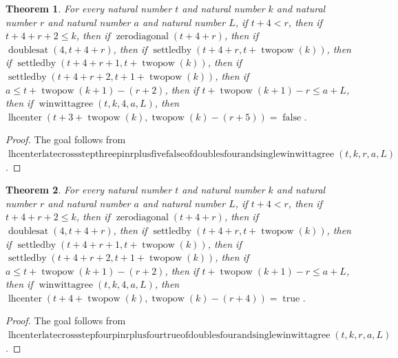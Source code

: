 \documentclass[11pt]{article}
\newtheorem{theorem}{Theorem}[section]
\theoremstyle{definition}
\begin{document}
\begin{theorem}
\label{ll:paper:lhcenter-late-cross-step-three-pin-r-plus-five-false-of-doubles-four-and-single-winwittagree}
For every natural number \(t\) and natural number \(k\) and natural number \(r\) and natural number \(a\) and natural number \(L\), if \(t + 4 < r\), then if \(t + 4 + r + 2 \le k\), then if \(\operatorname{zerodiagonal}(t + 4 + r)\), then if \(\operatorname{doublesat}(4, t + 4 + r)\), then if \(\operatorname{settledby}(t + 4 + r, t + \operatorname{twopow}(k))\), then if \(\operatorname{settledby}(t + 4 + r + 1, t + \operatorname{twopow}(k))\), then if \(\operatorname{settledby}(t + 4 + r + 2, t + 1 + \operatorname{twopow}(k))\), then if \(a \le t + \operatorname{twopow}(k + 1) - (r + 2)\), then if \(t + \operatorname{twopow}(k + 1) - r \le a + L\), then if \(\operatorname{winwittagree}(t, k, 4, a, L)\), then \(\operatorname{lhcenter}(t + 3 + \operatorname{twopow}(k), \operatorname{twopow}(k) - (r + 5)) = \operatorname{false}\).
\end{theorem}
\begin{proof}
The goal follows from \(\operatorname{lhcenterlatecrossstepthreepinrplusfivefalseofdoublesfourandsinglewinwittagree}(t, k, r, a, L)\).
\end{proof}
\begin{theorem}
\label{ll:paper:lhcenter-late-cross-step-four-pin-r-plus-four-true-of-doubles-four-and-single-winwittagree}
For every natural number \(t\) and natural number \(k\) and natural number \(r\) and natural number \(a\) and natural number \(L\), if \(t + 4 < r\), then if \(t + 4 + r + 2 \le k\), then if \(\operatorname{zerodiagonal}(t + 4 + r)\), then if \(\operatorname{doublesat}(4, t + 4 + r)\), then if \(\operatorname{settledby}(t + 4 + r, t + \operatorname{twopow}(k))\), then if \(\operatorname{settledby}(t + 4 + r + 1, t + \operatorname{twopow}(k))\), then if \(\operatorname{settledby}(t + 4 + r + 2, t + 1 + \operatorname{twopow}(k))\), then if \(a \le t + \operatorname{twopow}(k + 1) - (r + 2)\), then if \(t + \operatorname{twopow}(k + 1) - r \le a + L\), then if \(\operatorname{winwittagree}(t, k, 4, a, L)\), then \(\operatorname{lhcenter}(t + 4 + \operatorname{twopow}(k), \operatorname{twopow}(k) - (r + 4)) = \operatorname{true}\).
\end{theorem}
\begin{proof}
The goal follows from \(\operatorname{lhcenterlatecrossstepfourpinrplusfourtrueofdoublesfourandsinglewinwittagree}(t, k, r, a, L)\).
\end{proof}
\end{document}
